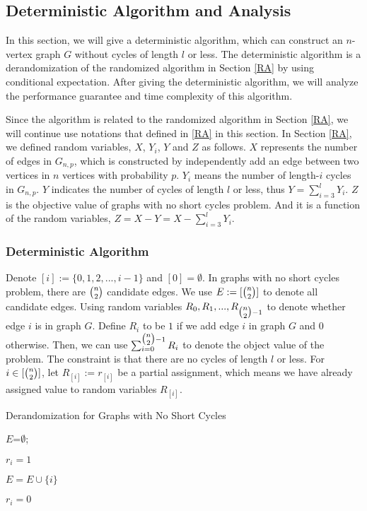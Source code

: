 \subsection{Deterministic Algorithm and Analysis}
In this section, we will give a deterministic algorithm, which can construct an $n$-vertex graph $G$ without cycles of length $l$ or less.
The deterministic algorithm is a derandomization of the randomized algorithm in Section \ref{RA} by using conditional expectation.
After giving the deterministic algorithm, we will analyze
the performance guarantee and time complexity of this algorithm. 

Since the algorithm is related to the randomized algorithm in Section \ref{RA}, we will continue use notations that defined in \ref{RA} in this section.
In Section \ref{RA}, we defined random variables, $X$, $Y_i$, $Y$ and $Z$ as follows. 
$X$ represents the number of edges in $G_{n,p}$, which is constructed by independently add an edge between two vertices in $n$ vertices with probability $p$. 
$Y_i$ means the number of length-$i$ cycles in $G_{n,p}$. 
$Y$ indicates the number of cycles of length $l$ or less, thus $Y=\sum_{i=3}^{l}Y_i$.
$Z$ is the objective value of graphs with no short cycles problem. And it is a function of the random variables, $Z=X-Y=X-\sum_{i=3}^{l}Y_i$.
\subsubsection{Deterministic Algorithm}
Denote $[i]:=\{0,1,2,...,i-1\}$ and $[0]=\emptyset$.
In graphs with no short cycles problem, there are $\tbinom{n}{2}$ candidate edges. 
We use $E:=[\tbinom{n}{2}]$ to denote all candidate edges. 
Using random variables $R_0, R_1, ..., R_{\tbinom{n}{2}-1}$ to denote whether edge $i$ is in graph $G$.
Define $R_i$ to be $1$ if we add edge $i$ in graph $G$ and $0$ otherwise. 
Then, we can use $\sum_{i=0}^{\tbinom{n}{2}-1}R_i$ to denote the object value of the problem. The constraint is that there are no cycles of length $l$ or less.
For $i\in [\tbinom{n}{2}]$, let $R_{[i]}:=r_{[i]}$ be a partial assignment, which means we have already assigned value to random variables $R_{[i]}$.


\begin{algorithm}
    \caption{Derandomization for Graphs with No Short Cycles}\label{alg}
    {
        $E$=$\emptyset$;

        {
            {
               $r_i=1$
               
               $ E=E\cup \{i\}$
            }
            \Else
            {
                $r_i=0$
            }
        
        }
    }
\end{algorithm}
